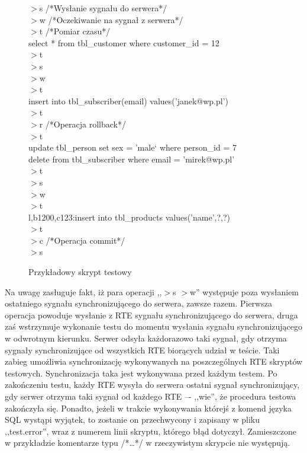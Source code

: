 \begin{figure}[t]
{\footnotesize
$>$s /*Wysłanie sygnału do serwera*/\\
$>$w /*Oczekiwanie na sygnał z serwera*/\\
$>$t /*Pomiar czasu*/\\
select * from tbl\_customer where customer\_id = 12\\
$>$t \\
$>$s \\
$>$w \\
$>$t \\
insert into tbl\_subscriber(email) values('janek@wp.pl')\\
$>$t \\
$>$r /*Operacja rollback*/\\
$>$t \\
update tbl\_person set sex = 'male‘ where person\_id = 7\\
delete from tbl\_subscriber where email = 'mirek@wp.pl'\\
$>$t\\
$>$s\\
$>$w\\
$>$t\\
l,b1200,c123:insert into tbl\_products values('name',?,?)\\
$>$t\\
$>$c /*Operacja commit*/\\
$>$s\\ 
}
\caption{Przykładowy skrypt testowy}\label{rys:test-script}
\end{figure}
Na uwagę zasługuje fakt, iż para operacji ,,$>$s $>$w'' występuje poza wysłaniem ostatniego sygnału 
synchronizującego do serwera, zawsze razem. Pierwsza operacja powoduje wysłanie z RTE sygnału 
synchronizującego do serwera, druga zaś wstrzymuje wykonanie testu do momentu wysłania sygnału 
synchronizującego w odwrotnym kierunku. Serwer odsyła każdorazowo taki sygnał, gdy otrzyma 
sygnały synchronizujące od wszystkich RTE biorących udział w teście. Taki zabieg umożliwia synchronizację 
wykonywanych na poszczególnych RTE skryptów testowych. Synchronizacja taka jest wykonywana 
przed każdym testem. Po zakończeniu testu, każdy RTE wysyła do serwera ostatni sygnał synchronizujący, 
gdy serwer otrzyma taki sygnał od każdego RTE –- ,,wie'', że procedura testowa zakończyła się.
Ponadto, jeżeli w trakcie wykonywania którejś z komend języka SQL wystąpi wyjątek, to zostanie 
on przechwycony i zapisany w pliku ,,test.error'', wraz z numerem linii skryptu, którego błąd dotyczył. 
Zamieszczone w przykładzie komentarze typu /*…*/ w rzeczywistym skrypcie nie występują. 

